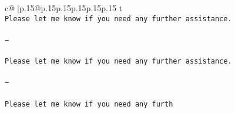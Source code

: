 \documentclass{article}
\begin{document}
{\begin{supertabular}{c@{$\;$}|p{.15\linewidth}@{}p{.15\linewidth}p{.15\linewidth}p{.15\linewidth}p{.15\linewidth}p{.15\linewidth}}
{{{t \\ \tt Please let me know if you need any further assistance. \\ \tt \\ \tt ---\\ \tt \\ \tt Please let me know if you need any further assistance. \\ \tt \\ \tt ---\\ \tt \\ \tt Please let me know if you need any furth}}}
\end{supertabular}}
\end{document}

